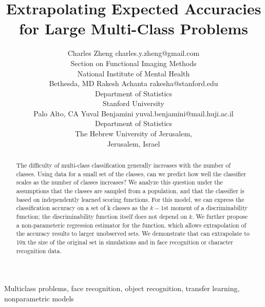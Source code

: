 \documentclass[twoside,11pt]{article}
\begin{document}
\title{Extrapolating Expected Accuracies for Large Multi-Class Problems}

\editor{}

\author{\name Charles Zheng \email charles.y.zheng@gmail.com \\
       \addr Section on Functional Imaging Methods\\
       National Institute of Mental Health\\
       Bethesda, MD 
       \AND
       \name Rakesh Achanta \email rakesha@stanford.edu \\
       \addr Department of Statistics\\
       Stanford University\\
       Palo Alto, CA 
       \AND
       \name Yuval Benjamini \email yuval.benjamini@mail.huji.ac.il \\
       \addr Department of Statistics\\
       The Hebrew University of Jerusalem,\\
       Jerusalem, Israel}

\maketitle

\begin{abstract}%
The difficulty of multi-class classification generally increases with
the number of classes.  Using data for a small set of the classes, can
we predict how well the classifier scales as the number of classes increases?
We analyze this question under the assumptions that the classes are sampled from 
a population, and that the classifier is based on independently learned scoring functions. 
For this model, we can express the classification accuracy on a set of k classes as the $k-1$st moment of a discriminability function; the discriminability function itself does not depend on $k$. 
We further propose a non-parameteric regression estimator for the function, which 
allows extrapolation of the accuracy results to larger unobserved sets. We demonstrate 
that can extrapolate to 10x the size of the original set in simulations and in face recognition or character recognition data.  
\end{abstract}

\begin{keywords}
Multiclass problems, face recognition, object recognition, transfer learning, nonparametric models
\end{keywords}
\end{document}
